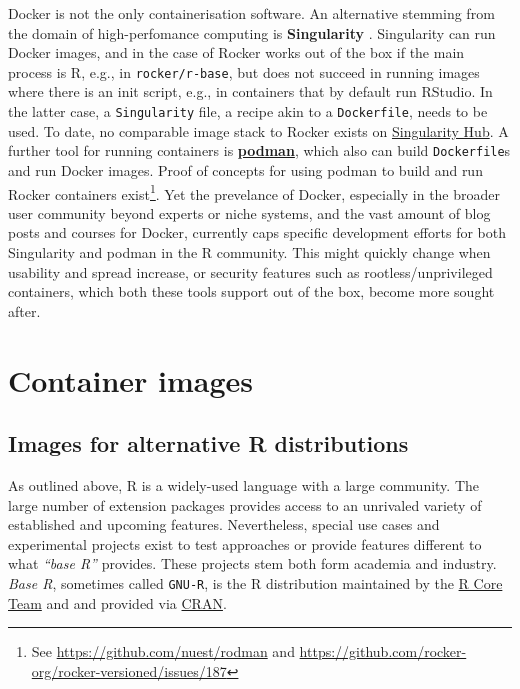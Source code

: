 Docker is not the only containerisation software. An alternative
stemming from the domain of high-perfomance computing is
\textbf{Singularity} \citep{kurtzer_singularity_2017}. Singularity can
run Docker images, and in the case of Rocker works out of the box if the
main process is R, e.g., in \texttt{rocker/r-base}, but does not succeed
in running images where there is an init script, e.g., in containers
that by default run RStudio. In the latter case, a \texttt{Singularity}
file, a recipe akin to a \texttt{Dockerfile}, needs to be used. To date,
no comparable image stack to Rocker exists on
\href{https://singularity-hub.org/}{Singularity Hub}. A further tool for
running containers is
\href{https://github.com/containers/libpod}{\textbf{podman}}, which also
can build \texttt{Dockerfile}s and run Docker images. Proof of concepts
for using podman to build and run Rocker containers
exist\footnote{See \href{https://github.com/nuest/rodman}{https://github.com/nuest/rodman} and \href{https://github.com/rocker-org/rocker-versioned/issues/187}{https://github.com/rocker-org/rocker-versioned/issues/187}}.
Yet the prevelance of Docker, especially in the broader user community
beyond experts or niche systems, and the vast amount of blog posts and
courses for Docker, currently caps specific development efforts for both
Singularity and podman in the R community. This might quickly change
when usability and spread increase, or security features such as
rootless/unprivileged containers, which both these tools support out of
the box, become more sought after.

\hypertarget{container-images}{%
\section{Container images}\label{container-images}}

\hypertarget{images-for-alternative-r-distributions}{%
\subsection{Images for alternative R
distributions}\label{images-for-alternative-r-distributions}}

As outlined above, R is a widely-used language with a large community.
The large number of extension packages provides access to an unrivaled
variety of established and upcoming features. Nevertheless, special use
cases and experimental projects exist to test approaches or provide
features different to what \emph{``base R''} provides. These projects
stem both form academia and industry. \emph{Base R}, sometimes called
\texttt{GNU-R}, is the R distribution maintained by the
\href{https://www.r-project.org/contributors.html}{R Core Team} and and
provided via \href{https://cran.r-project.org/}{CRAN}.

